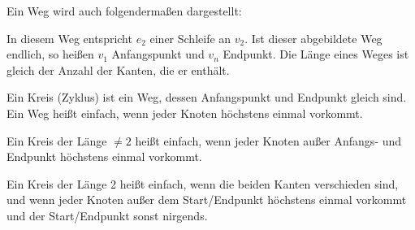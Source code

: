 \begin{definition}
    Ein Weg wird auch folgendermaßen dargestellt:
    \vspace{2mm}
    
    \begin{center}
    \end{center}
    
    In diesem Weg entspricht $e_2$ einer Schleife an $v_2$. Ist dieser
    abgebildete Weg endlich, so heißen $v_1$ Anfangspunkt und $v_n$ Endpunkt.
    Die Länge eines Weges ist gleich der Anzahl der Kanten, die er enthält.
    
    Ein Kreis (Zyklus) ist ein Weg, dessen Anfangspunkt und Endpunkt gleich
    sind. Ein Weg heißt einfach, wenn jeder Knoten höchstens einmal vorkommt. 
    
    Ein Kreis der Länge $\ne 2$ heißt einfach, wenn jeder Knoten außer Anfangs-
    und Endpunkt höchstens einmal vorkommt. 
    
    Ein Kreis der Länge 2 heißt einfach, wenn die beiden Kanten verschieden
    sind, und wenn jeder Knoten außer dem Start/Endpunkt höchstens einmal
    vorkommt und der Start/Endpunkt sonst nirgends.
\end{definition}

